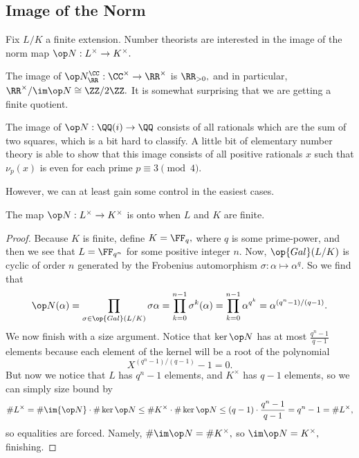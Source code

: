 \documentclass[../notes.tex]{subfiles}
\begin{document}
\subsection{Image of the Norm}
Fix $L/K$ a finite extension. Number theorists are interested in the image of the norm map $\op N:L^\times\to K^\times.$
\begin{example}
	The image of $\op N^\CC_\RR:\CC^\times\to\RR^\times$ is $\RR_{>0},$ and in particular, $\RR^\times/\im\op N\cong\ZZ/2\ZZ.$ It is somewhat surprising that we are getting a finite quotient.
\end{example}
\begin{example}
	The image of $\op N:\QQ(i)\to\QQ$ consists of all rationals which are the sum of two squares, which is a bit hard to classify. A little bit of elementary number theory is able to show that this image consists of all positive rationals $x$ such that $\nu_p(x)$ is even for each prime $p\equiv3\pmod4.$
\end{example}
However, we can at least gain some control in the easiest cases.
\begin{exe}
	The map $\op N:L^\times\to K^\times$ is onto when $L$ and $K$ are finite.
\end{exe}
\begin{proof}
	Because $K$ is finite, define $K=\FF_q,$ where $q$ is some prime-power, and then we see that $L=\FF_{q^n}$ for some positive integer $n.$ Now, $\op{Gal}(L/K)$ is cyclic of order $n$ generated by the Frobenius automorphism $\sigma:\alpha\mapsto\alpha^q.$ So we find that
	\[\op N(\alpha)=\prod_{\sigma\in\op{Gal}(L/K)}\sigma\alpha=\prod_{k=0}^{n-1}\sigma^k(\alpha)=\prod_{k=0}^{n-1}\alpha^{q^k}=\alpha^{\left(q^n-1\right)/(q-1)}.\]
	We now finish with a size argument. Notice that $\ker\op N$ has at most $\frac{q^n-1}{q-1}$ elements because each element of the kernel will be a root of the polynomial
	\[X^{\left(q^n-1\right)/(q-1)}-1=0.\]
	But now we notice that $L$ has $q^n-1$ elements, and $K^\times$ has $q-1$ elements, so we can simply size bound by
	\[\#L^\times=\#\im{\op N}\cdot\#\ker\op N\le\#K^\times\cdot\#\ker\op N\le(q-1)\cdot\frac{q^n-1}{q-1}=q^n-1=\#L^\times,\]
	so equalities are forced. Namely, $\#\im\op N=\#K^\times,$ so $\im\op N=K^\times,$ finishing.
\end{proof}
\end{document}
